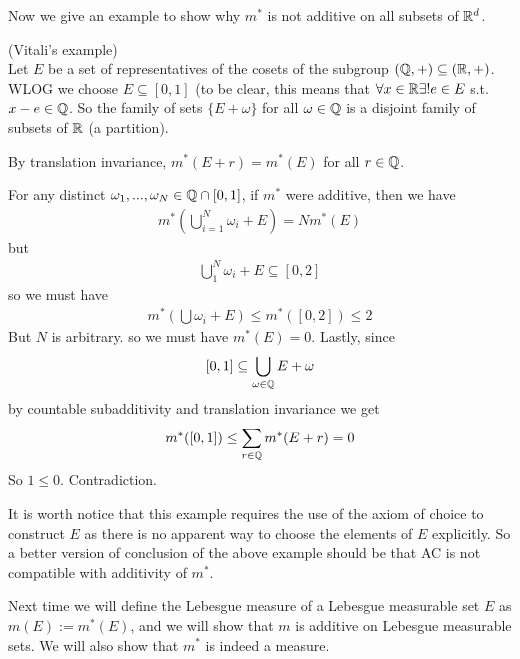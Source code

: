 \documentclass[a4paper]{article}
\begin{document}
Now we give an example to show why $m^*$ is not additive on all subsets of $\mathbb{R}^d$.

\begin{eg} (Vitali's example)\\
Let $E$ be a set of representatives of the cosets of the subgroup $(\mathbb{Q},+) \subseteq (\mathbb{R},+)$. WLOG we choose $E \subseteq [0,1]$ (to be clear, this means that $\forall x \in \mathbb{R} \exists! e\in E$ s.t. $x-e \in \mathbb{Q}$. So the family of sets $\{E+\omega\}$ for all $\omega \in \mathbb{Q}$ is a disjoint family of subsets of $\mathbb{R}$ (a partition).

By translation invariance, $m^*(E+r)=m^*(E)$ for all $r \in \mathbb{Q}$.

For any distinct $\omega_1,...,\omega_N \in \mathbb{Q} \cap [0,1]$, if $m^*$ were additive, then we have
\begin{equation*}
\begin{aligned}
m^*(\bigcup_{i=1}^N \omega_i + E) = N m^*(E)
\end{aligned}
\end{equation*}
but
\begin{equation*}
\begin{aligned}
\bigcup_1^N \omega_i+E \subseteq [0,2]
\end{aligned}
\end{equation*}
so we must have
\begin{equation*}
\begin{aligned}
m^* (\bigcup \omega_i+E)\leq m^*([0,2]) \leq 2
\end{aligned}
\end{equation*}
But $N$ is arbitrary. so we must have $m^*(E) = 0$. Lastly, since
\begin{equation*}
\begin{aligned}
[0,1] \subseteq \bigcup_{\omega \in \Q} E+\omega
\end{aligned}
\end{equation*}
by countable subadditivity and translation invariance we get
\begin{equation*}
\begin{aligned}
m^*([0,1]) \leq \sum_{r \in \mathbb{Q}} m^*(E+r) = 0
\end{aligned}
\end{equation*}
So $1 \leq 0$. Contradiction.
\end{eg}

\begin{rem}
It is worth notice that this example requires the use of the axiom of choice to construct $E$ as there is no apparent way to choose the elements of $E$ explicitly. So a better version of conclusion of the above example should be that AC is not compatible with additivity of $m^*$.

Next time we will define the Lebesgue measure of a Lebesgue measurable set $E$ as $m(E) := m^*(E)$, and we will show that $m$ is additive on Lebesgue measurable sets. We will also show that $m^*$ is indeed a measure.
\end{rem}
\end{document}
